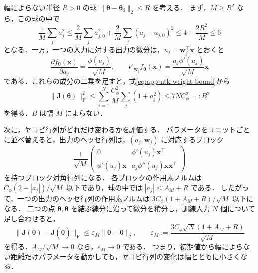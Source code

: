 \documentclass[../main.tex]{subfiles}
\begin{document}
幅によらない半径 $R>0$ の球 $\|\bm{\theta}-\bm{\theta}_0\|_2\leq R$ を考える．
まず，$M\geq R^2$ なら，この球の中で
\begin{equation}
  \frac1M\sum_j a_j^2
  \leq\frac2M\sum_j a_{j,0}^2
    +\frac2M\sum_j(a_j-a_{j,0})^2
  \leq4+\frac{2R^2}{M}\leq6
  \label{eq:app-ntk-weight-bound}
\end{equation}
となる．一方，一つの入力に対する出力の微分は，$u_j=\bm{w}_j^\top\bm{x}$ とおくと
\begin{equation}
  \frac{\partial f_{\bm{\theta}}(\bm{x})}{\partial a_j}
  =\frac{\phi(u_j)}{\sqrt{M}},
  \qquad
  \nabla_{\bm{w}_j}f_{\bm{\theta}}(\bm{x})
  =\frac{a_j\phi'(u_j)}{\sqrt{M}}\bm{x}
  \label{eq:app-ntk-first-derivatives}
\end{equation}
である．これらの成分の二乗を足すと，式\eqref{eq:app-ntk-weight-bound}から
\begin{equation}
  \|\bm{J}(\bm{\theta})\|_{\mathrm F}^2
  \leq\sum_{i=1}^N\frac{C_\phi^2}{M}
    \sum_j(1+a_j^2)
  \leq7NC_\phi^2=:B^2
  \label{eq:app-ntk-jacobian-bound}
\end{equation}
を得る．$B$ は幅 $M$ によらない．

次に，ヤコビ行列がどれだけ変わるかを評価する．
パラメータをユニットごとに並べ替えると，出力のヘッセ行列は，$(a_j,\bm{w}_j)$ に対応するブロック
\begin{equation}
  \frac1{\sqrt{M}}
  \begin{pmatrix}
    0&\phi'(u_j)\bm{x}^\top\\
    \phi'(u_j)\bm{x}&a_j\phi''(u_j)\bm{x}\bm{x}^\top
  \end{pmatrix}
  \label{eq:app-ntk-output-hessian}
\end{equation}
を持つブロック対角行列になる．
各ブロックの作用素ノルムは $C_\phi(2+|a_j|)/\sqrt{M}$ 以下であり，球の中では $|a_j|\leq A_M+R$ である．
したがって，一つの出力のヘッセ行列の作用素ノルムは $3C_\phi(1+A_M+R)/\sqrt{M}$ 以下になる．
二つの点 $\bm{\theta},\widetilde{\bm{\theta}}$ を結ぶ線分に沿って微分を積分し，訓練入力 $N$ 個について足し合わせると，
\begin{equation}
  \|\bm{J}(\bm{\theta})-\bm{J}(\widetilde{\bm{\theta}})\|_{\mathrm F}
  \leq\varepsilon_M\|\bm{\theta}-\widetilde{\bm{\theta}}\|_2,
  \qquad
  \varepsilon_M:=\frac{3C_\phi\sqrt{N}(1+A_M+R)}{\sqrt{M}}
  \label{eq:app-ntk-local-lipschitz}
\end{equation}
を得る．$A_M/\sqrt{M}\to0$ なら，$\varepsilon_M\to0$ である．
つまり，初期値から幅によらない距離だけパラメータを動かしても，ヤコビ行列の変化は幅とともに小さくなる．
\end{document}
